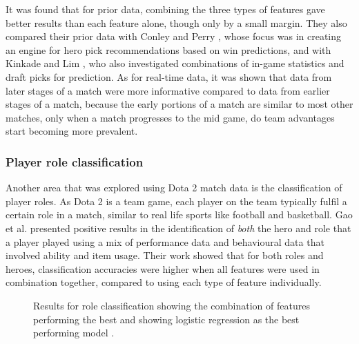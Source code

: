 \documentclass[Report.tex]{subfiles}
\begin{document}
It was found that for prior data, combining the three types of features gave better results than each feature alone, though only by a small margin. They also compared their prior data with Conley and Perry \cite{dota-conley}, whose focus was in creating an engine for hero pick recommendations based on win predictions, and with Kinkade and Lim \cite{dota-kinkade}, who also investigated combinations of in-game statistics and draft picks for prediction. As for real-time data, it was shown that data from later stages of a match were more informative compared to data from earlier stages of a match, because the early portions of a match are similar to most other matches, only when a match progresses to the mid game, do team advantages start becoming more prevalent.

\subsubsection{Player role classification}
Another area that was explored using Dota 2 match data is the classification of player roles. As Dota 2 is a team game, each player on the team typically fulfil a certain role in a match, similar to real life sports like football and basketball. Gao et al. \cite{dota-gao} presented positive results in the identification of \textit{both} the hero and role that a player played using a mix of performance data and behavioural data that involved ability and item usage. Their work showed that for both roles and heroes, classification accuracies were higher when all features were used in combination together, compared to using each type of feature individually.

\begin{figure}[H]
\begin{subfigure}{0.45\textwidth}
\end{subfigure}
\hspace{\fill}
\begin{subfigure}{0.45\textwidth}
\end{subfigure}
\caption{Results for role classification showing the combination of features performing the best \cite{dota-gao} and showing logistic regression as the best performing model \cite{dota-eggert}.}
\end{figure}
\end{document}
